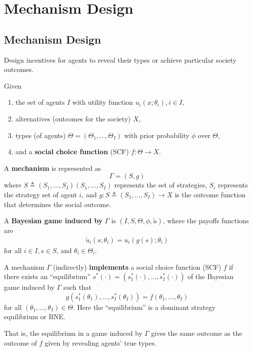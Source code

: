\documentclass[11pt]{elegantbook}
\begin{document}
\chapter{Mechanism Design}

\section{Mechanism Design}
Design incentives for agents to reveal their types or achieve particular society outcomes.

Given
\begin{enumerate}
    \item the set of agents $I$ with utility function $u_i(x;\theta_i),i\in I$,
    \item alternatives (outcomes for the society) $X$,
    \item  types (of agents) $\Theta=(\Theta_1,...,\Theta_I)$ with prior probability $\phi$ over $\Theta$,
    \item and a \textbf{social choice function} (SCF) $f:\Theta\rightarrow X$.
\end{enumerate}

\begin{definition}[Mechanism $\Gamma=(S,g)$]
    \normalfont
    A \textbf{mechanism} is represented as $$\Gamma=\left(S, g\right)$$
    where $S\triangleq(S_1,...,S_I)(S_1,...,S_I)$ represents the set of strategies, $S_i$ represents the strategy set of agent $i$, and $g:S\triangleq(S_1,...,S_I) \rightarrow X$ is the outcome function that determines the social outcome.
\end{definition}

A \textbf{Bayesian game induced by} $\Gamma$ is $(I,S,\Theta,\phi,\tilde{u})$, where the payoffs functions are
\begin{equation}
    \begin{aligned}
        \tilde{u}_i(s;\theta_i)=u_i(g(s);\theta_i)
    \end{aligned}
    \nonumber
\end{equation}
for all $i\in I, s\in S$, and $\theta_i\in\Theta_i$.

\begin{definition}
    \normalfont
    A mechanism $\Gamma$ (indirectly) \textbf{implements} a social choice function (SCF) $f$ if there exists an ``equilibrium'' $s^*(\cdot)=\left(s_1^*(\cdot),...,s_I^*(\cdot)\right)$ of the Bayesian game induced by $\Gamma$ such that $$g(s_1^*(\theta_1),...,s_I^*(\theta_I))=f(\theta_1,...,\theta_I)$$ for all $(\theta_1,...,\theta_I)\in \Theta$. Here the ``equilibrium'' is a dominant strategy equilibrium or BNE.
\end{definition}
That is, the equilibrium in a game induced by $\Gamma$ gives the same outcome as the outcome of $f$ given by revealing agents' true types.
\end{document}
